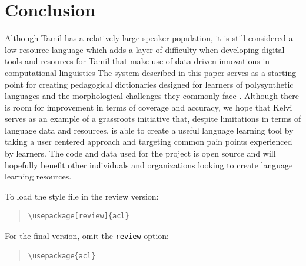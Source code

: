 \documentclass[11pt]{article}
\begin{document}
\section{Conclusion}
Although Tamil has a relatively large speaker population, it is still considered a 
low-resource language which adds a layer of difficulty when developing digital tools 
and resources for Tamil that make use of data driven innovations in 
computational linguistics \citep{noauthor_tamil_2025} 
The system described in this paper serves as a starting point for 
creating pedagogical dictionaries designed for learners of 
polysynthetic languages and the morphological challenges they 
commonly face \citep{kazantseva_kawennonnis_2018}. 
Although there is room for improvement in terms of coverage and accuracy, 
we hope that Kelvi serves as an example of a grassroots initiative that, 
despite limitations in terms of language data and resources, 
is able to create a useful language learning tool by 
taking a user centered approach and targeting common pain points 
experienced by learners. The code and data used for the project 
is open source and will hopefully benefit other individuals and 
organizations looking to create language learning resources. 






To load the style file in the review version:
\begin{quote}
\begin{verbatim}
\usepackage[review]{acl}
\end{verbatim}
\end{quote}
For the final version, omit the \verb|review| option:
\begin{quote}
\begin{verbatim}
\usepackage{acl}
\end{verbatim}
\end{quote}
\end{document}
